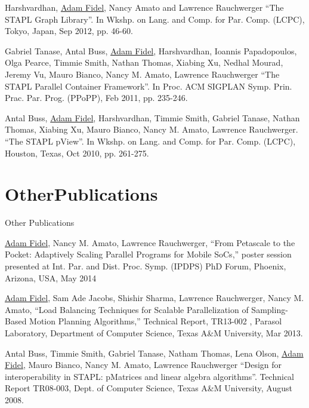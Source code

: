\documentclass[a4paper,10pt,oneside]{article}
\begin{document}
\begin{body}
\EntryGap

{Harshvardhan, \underline{Adam Fidel}, Nancy Amato and Lawrence Rauchwerger ``The STAPL Graph Library''. In Wkshp. on Lang. and Comp. for Par. Comp. (LCPC), Tokyo, Japan, Sep 2012, pp. 46-60.}

\EntryGap

{Gabriel Tanase, Antal Buss, \underline{Adam Fidel}, Harshvardhan, Ioannis Papadopoulos, Olga Pearce, Timmie Smith, Nathan Thomas, Xiabing Xu, Nedhal Mourad, Jeremy Vu, Mauro Bianco, Nancy M. Amato, Lawrence Rauchwerger ``The STAPL Parallel Container Framework''. In Proc. ACM SIGPLAN Symp. Prin. Prac. Par. Prog. (PPoPP), Feb 2011, pp. 235-246.}

\EntryGap

{Antal Buss, \underline{Adam Fidel}, Harshvardhan, Timmie Smith, Gabriel Tanase, Nathan Thomas, Xiabing Xu, Mauro Bianco, Nancy M. Amato, Lawrence Rauchwerger. ``The STAPL pView''. In Wkshp. on Lang. and Comp. for Par. Comp. (LCPC), Houston, Texas, Oct 2010, pp. 261-275.}

\EntryGap

\section{OtherPublications}
{Other Publications}

{\underline{Adam Fidel}, Nancy M. Amato, Lawrence Rauchwerger, ``From Petascale to the Pocket: Adaptively Scaling Parallel Programs for Mobile SoCs,'' poster
session presented at Int. Par. and Dist. Proc. Symp. (IPDPS) PhD Forum, Phoenix, Arizona, USA, May 2014}

\EntryGap


{\underline{Adam Fidel}, Sam Ade Jacobs, Shishir Sharma, Lawrence Rauchwerger, Nancy M. Amato, ``Load Balancing Techniques for Scalable Parallelization of Sampling-Based Motion Planning Algorithms,'' Technical Report, TR13-002 , Parasol Laboratory, Department of Computer Science, Texas A\&M University, Mar 2013.}

\EntryGap


{Antal Buss, Timmie Smith, Gabriel Tanase, Natham Thomas, Lena Olson, \underline{Adam Fidel}, Mauro Bianco, Nancy M. Amato, Lawrence Rauchwerger ``Design for interoperability in STAPL: pMatrices and linear algebra algorithms''. Technical Report TR08-003, Dept. of Computer Science, Texas A\&M University, August 2008.}



\end{body}
\end{document}
